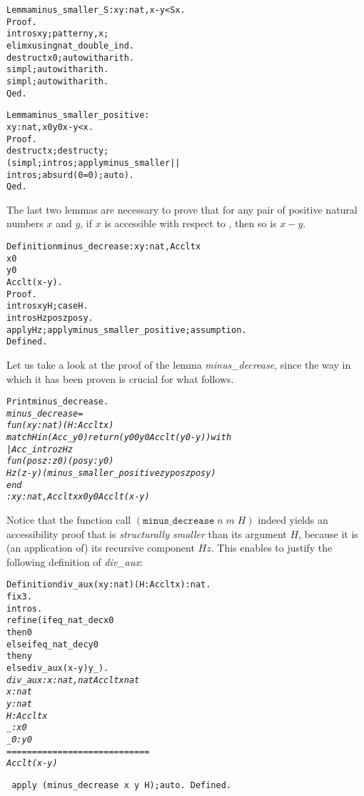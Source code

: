 \documentclass[11pt]{article}
\begin{document}
\begin{alltt}
Lemma minus_smaller_S : {\prodsym} x y:nat, x - y < S x.
Proof.
 intros x y; pattern y, x;
 elim x using nat_double_ind.
 destruct x0; auto with arith.
 simpl; auto with arith.
 simpl; auto with arith.
Qed.


Lemma minus_smaller_positive :
 {\prodsym} x y:nat, x {\coqdiff}0 {\arrow} y {\coqdiff} 0 {\arrow}  x - y < x.
Proof.
 destruct x; destruct y;
 ( simpl;intros; apply minus_smaller ||
   intros; absurd (0=0); auto).
Qed.
\end{alltt}

\noindent The last two lemmas are necessary to prove that for any pair
of positive natural numbers $x$ and $y$, if $x$ is accessible with
respect to , then so is $x-y$.

\begin{alltt}
Definition minus_decrease : {\prodsym} x y:nat, Acc lt x {\arrow}
                                         x {\coqdiff} 0 {\arrow}
                                         y {\coqdiff} 0 {\arrow}
                                         Acc lt (x-y).
Proof.
 intros x y H; case H.
 intros Hz posz posy.
 apply Hz; apply minus_smaller_positive; assumption.
Defined.
\end{alltt}

Let us take a look at the proof of the lemma \textsl{minus\_decrease}, since
the way in which it has been proven is crucial for what follows.
\begin{alltt}
Print minus_decrease.
\it
minus_decrease =
fun (x y : nat) (H : Acc lt x) {\funarrow}
match H in (Acc _ y0) return (y0 {\coqdiff} 0 {\arrow} y {\coqdiff} 0 {\arrow} Acc lt (y0 - y)) with
| Acc_intro z Hz {\funarrow}
    fun (posz : z {\coqdiff} 0) (posy : y {\coqdiff} 0) {\funarrow}
    Hz (z - y) (minus_smaller_positive z y posz posy)
end
     : {\prodsym} x y : nat, Acc lt x {\arrow} x {\coqdiff} 0 {\arrow} y {\coqdiff} 0 {\arrow} Acc lt (x - y)

\end{alltt}
\noindent Notice that the function call
$(\texttt{minus\_decrease}\;n\;m\;H)$
indeed yields an accessibility proof that is \textsl{structurally
smaller} than its argument $H$, because it is (an application of) its
recursive component $Hz$.  This enables to justify the following
definition of \textsl{div\_aux}:

\begin{alltt}
Definition div_aux (x y:nat)(H: Acc lt x):nat.
 fix 3.
 intros.
 refine (if eq_nat_dec x 0
         then 0
         else if eq_nat_dec y 0
              then y
              else div_aux (x-y) y _).
\it
 div_aux : {\prodsym} x : nat, nat {\arrow} Acc lt x {\arrow} nat
  x : nat
  y : nat
  H : Acc lt x
  _ : x {\coqdiff} 0
  _0 : y {\coqdiff} 0
  ============================
   Acc lt (x - y)

\tt
 apply (minus_decrease x y H);auto.
Defined.
\end{alltt}
\end{document}
